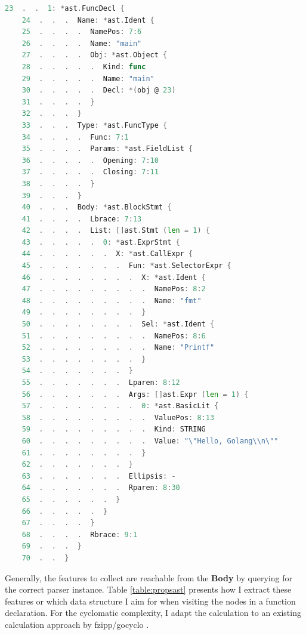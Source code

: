 \documentclass{seal_thesis}
\begin{document}
\begin{minipage}{\linewidth}
\begin{lstlisting}[caption=Sample output from yuroyoro's Ast Viewer \cite{goastviewer}., label={yuroyoro}, language=Go, frame=single, ]
	23  .  .  1: *ast.FuncDecl {
	24  .  .  .  Name: *ast.Ident {
	25  .  .  .  .  NamePos: 7:6
	26  .  .  .  .  Name: "main"
	27  .  .  .  .  Obj: *ast.Object {
	28  .  .  .  .  .  Kind: func
	29  .  .  .  .  .  Name: "main"
	30  .  .  .  .  .  Decl: *(obj @ 23)
	31  .  .  .  .  }
	32  .  .  .  }
	33  .  .  .  Type: *ast.FuncType {
	34  .  .  .  .  Func: 7:1
	35  .  .  .  .  Params: *ast.FieldList {
	36  .  .  .  .  .  Opening: 7:10
	37  .  .  .  .  .  Closing: 7:11
	38  .  .  .  .  }
	39  .  .  .  }
	40  .  .  .  Body: *ast.BlockStmt {
	41  .  .  .  .  Lbrace: 7:13
	42  .  .  .  .  List: []ast.Stmt (len = 1) {
	43  .  .  .  .  .  0: *ast.ExprStmt {
	44  .  .  .  .  .  .  X: *ast.CallExpr {
	45  .  .  .  .  .  .  .  Fun: *ast.SelectorExpr {
	46  .  .  .  .  .  .  .  .  X: *ast.Ident {
	47  .  .  .  .  .  .  .  .  .  NamePos: 8:2
	48  .  .  .  .  .  .  .  .  .  Name: "fmt"
	49  .  .  .  .  .  .  .  .  }
	50  .  .  .  .  .  .  .  .  Sel: *ast.Ident {
	51  .  .  .  .  .  .  .  .  .  NamePos: 8:6
	52  .  .  .  .  .  .  .  .  .  Name: "Printf"
	53  .  .  .  .  .  .  .  .  }
	54  .  .  .  .  .  .  .  }
	55  .  .  .  .  .  .  .  Lparen: 8:12
	56  .  .  .  .  .  .  .  Args: []ast.Expr (len = 1) {
	57  .  .  .  .  .  .  .  .  0: *ast.BasicLit {
	58  .  .  .  .  .  .  .  .  .  ValuePos: 8:13
	59  .  .  .  .  .  .  .  .  .  Kind: STRING
	60  .  .  .  .  .  .  .  .  .  Value: "\"Hello, Golang\\n\""
	61  .  .  .  .  .  .  .  .  }
	62  .  .  .  .  .  .  .  }
	63  .  .  .  .  .  .  .  Ellipsis: -
	64  .  .  .  .  .  .  .  Rparen: 8:30
	65  .  .  .  .  .  .  }
	66  .  .  .  .  .  }
	67  .  .  .  .  }
	68  .  .  .  .  Rbrace: 9:1
	69  .  .  .  }
	70  .  .  }
\end{lstlisting}
\end{minipage}

\noindent Generally, the features to collect are reachable from the \textbf{Body} by querying for the correct parser instance. Table \ref{table:propsast} presents how I extract these features or which data structure I aim for when visiting the nodes in a function declaration. For the cyclomatic complexity, I adapt the calculation to an existing calculation approach by fzipp/gocyclo \cite{gocyclo}. 
\end{document}
